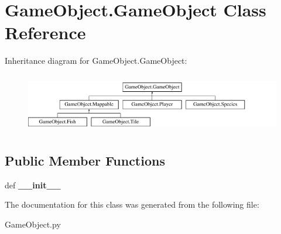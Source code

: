 \hypertarget{classGameObject_1_1GameObject}{\section{\-Game\-Object.\-Game\-Object \-Class \-Reference}
\label{classGameObject_1_1GameObject}
}
\-Inheritance diagram for \-Game\-Object.\-Game\-Object\-:\begin{figure}[H]
\begin{center}
\leavevmode
\includegraphics[height=2.592592cm]{classGameObject_1_1GameObject}
\end{center}
\end{figure}
\subsection*{\-Public \-Member \-Functions}
\begin{DoxyCompactItemize}
\item 
\hypertarget{classGameObject_1_1GameObject_a388f494ea5093578fa2a386b20eb9f4a}{def {\bfseries \-\_\-\-\_\-init\-\_\-\-\_\-}}\label{classGameObject_1_1GameObject_a388f494ea5093578fa2a386b20eb9f4a}

\end{DoxyCompactItemize}


\-The documentation for this class was generated from the following file\-:\begin{DoxyCompactItemize}
\item 
\-Game\-Object.\-py\end{DoxyCompactItemize}
